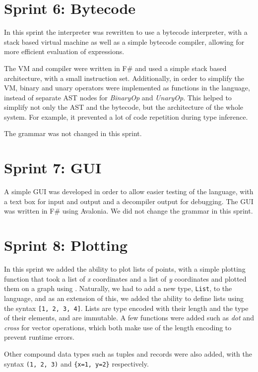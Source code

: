 \section{Sprint 6: Bytecode}\label{sec:bytecode}

In this sprint the interpreter was rewritten to use a bytecode interpreter, with a stack based virtual machine as 
well as a simple bytecode compiler, allowing for more efficient evaluation of expressions.

The VM and compiler were written in F\# and used a simple stack based architecture, with a small instruction set.
Additionally, in order to simplify the VM, binary and unary operators were implemented as functions in the language, 
instead of separate AST nodes for \textit{BinaryOp} and \textit{UnaryOp}.
This helped to simplify not only the AST and the bytecode, but the architecture of the whole system.
For example, it prevented a lot of code repetition during type inference.

The grammar was not changed in this sprint.

\section{Sprint 7: GUI}\label{sec:gui}

A simple GUI was developed in order to allow easier testing of the language, with a text box for input and output and a 
decompiler output for debugging.
The GUI was written in F\# using Avalonia\citep{avalonia}.
We did not change the grammar in this sprint.

\section{Sprint 8: Plotting}\label{sec:plotting1}

In this sprint we added the ability to plot lists of points, with a simple plotting function that took a list of
\textit{x} coordinates and a list of \textit{y} coordinates and plotted them on a graph using \citet{scottPlot}.
Naturally, we had to add a new type, \texttt{List}, to the language, and as an extension of this, we added the ability to
define lists using the syntax \texttt{[1, 2, 3, 4]}.
Lists are type encoded with their length and the type of their elements, and are immutable.
A few functions were added such as \textit{dot} and \textit{cross} for vector operations, which both make use of the 
length encoding to prevent runtime errors.

Other compound data types such as tuples and records were also added, with the syntax \texttt{(1, 2, 3)} and
\texttt{\{x=1, y=2\}} respectively.

